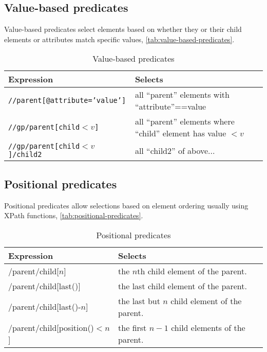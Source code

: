 \documentclass[slides]{pgnotes}
\begin{document}
\subsection{Value-based predicates}

Value-based predicates select elements based on whether they or their child elements or attributes match specific values, \autoref{tab:value-based-predicates}. 

  \begin{table}[htbp]
    \centering
    \begin{tabularx}{1.0\linewidth}{l X}
      \toprule
      \textbf{Expression} & \textbf{Selects} \\
      \midrule
      \texttt{//parent[@attribute='value']} &  all ``parent'' elements with ``attribute''==value \\
      \texttt{//gp/parent[child$<v$]} &  all ``parent'' elements where ``child'' element has value $<v$ \\
      \texttt{//gp/parent[child$<v$]/child2} &  all ``child2'' of above... \\
      \bottomrule
    \end{tabularx}
    \caption{Value-based predicates}
    \label{tab:value-based-predicates}
  \end{table}

\subsection{Positional predicates}

Positional predicates allow selections based on element ordering usually using XPath functions, \autoref{tab:positional-predicates}. 

\begin{table}[htbp]
  \centering
  \begin{tabularx}{1.0\linewidth}{l X}
    \toprule
    \textbf{Expression} & \textbf{Selects} \\
    \midrule
    /parent/child[$n$] & the $n$th child element of the parent. \\
    /parent/child[last()] & the last child element of the parent. \\
    /parent/child[last()-$n$] & the last but $n$ child element of the parent. \\
    /parent/child[position()$<n$] & the first $n-1$ child elements of the parent. \\
    \bottomrule
  \end{tabularx}
  \caption{Positional predicates}
  \label{tab:positional-predicates}
\end{table}
\end{document}
